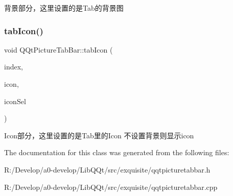 背景部分，这里设置的是\+Tab的背景图 \mbox{\label{class_q_qt_picture_tab_bar_a31191f17557f0b1842eeb5dea0d91b0e}} 
\subsubsection{\texorpdfstring{tab\+Icon()}{tabIcon()}}
{\footnotesize\ttfamily void Q\+Qt\+Picture\+Tab\+Bar\+::tab\+Icon (\begin{DoxyParamCaption}\item[{int}]{index,  }\item[{Q\+Image \&}]{icon,  }\item[{Q\+Image \&}]{icon\+Sel }\end{DoxyParamCaption})}

Icon部分，这里设置的是\+Tab里的\+Icon 不设置背景则显示icon 

The documentation for this class was generated from the following files\+:\begin{DoxyCompactItemize}
\item 
R\+:/\+Develop/a0-\/develop/\+Lib\+Q\+Qt/src/exquisite/qqtpicturetabbar.\+h\item 
R\+:/\+Develop/a0-\/develop/\+Lib\+Q\+Qt/src/exquisite/qqtpicturetabbar.\+cpp\end{DoxyCompactItemize}
